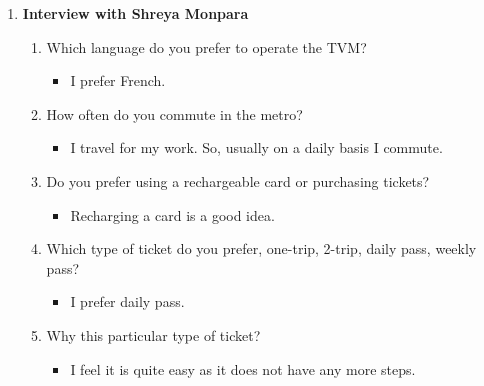\documentclass[15pt]{article}
\begin{document}
\begin{appendices}
\begin{enumerate}[leftmargin=3em, itemsep=0pt, parsep=0pt, , font=\Large\bfseries]
    
    \vspace{0.2cm}
    \item {\Large\bfseries Interview with Shreya Monpara}\\
    \begin{enumerate}[leftmargin=2em, itemsep=0pt, parsep=0pt, , font=\Large\bfseries]
        \item {\Large Which language do you prefer to operate the TVM?}
        \vspace{0.1cm}
            \begin{itemize}
                \item {\Large I prefer French.}
            \end{itemize}
            \vspace{0.2cm}
        \item {\Large How often do you commute in the metro?}
        \vspace{0.1cm}
            \begin{itemize}
                \item {\Large I travel for my work. So, usually on a daily basis I commute.}
            \end{itemize}
            \vspace{0.2cm}
        \item {\Large Do you prefer using a rechargeable card or purchasing tickets?}
        \vspace{0.1cm}
            \begin{itemize}
                \item {\Large  Recharging  a card is a good idea.}
            \end{itemize}
            \vspace{0.2cm}
        \item {\Large Which type of ticket do you prefer, one-trip, 2-trip, daily pass, weekly pass?}
        \vspace{0.1cm}
            \begin{itemize}
                \item {\Large I prefer daily pass.}
            \end{itemize}
            \vspace{0.2cm}
        \item {\Large Why this particular type of ticket?}
        \vspace{0.1cm}
            \begin{itemize}
                \item {\Large I feel it is quite easy as it does not have any more steps.}

\end{itemize}
\end{enumerate}
\end{enumerate}
\end{appendices}
\end{document}

